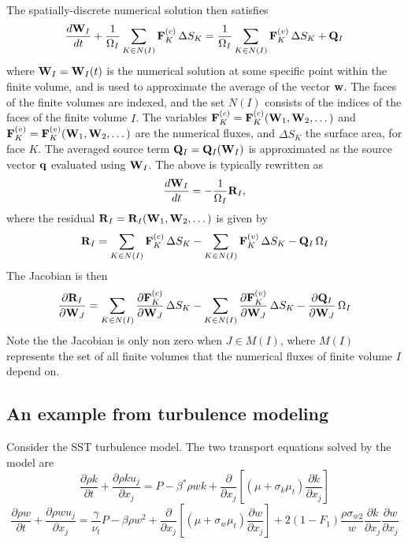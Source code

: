\documentclass[oneside,a4paper,11pt]{report}
\begin{document}
The spatially-discrete numerical solution then satisfies
\begin{equation}
\frac{d \mathbf{W}_I}{dt} +  \frac{1}{\Omega_I} \sum_{K \in N(I)} \mathbf{F}^{(c)}_K \,\Delta S_K = \frac{1}{\Omega_I} \sum_{K \in N(I)} \mathbf{F}^{(v)}_K \, \Delta S_K + \mathbf{Q}_I
\end{equation}
where $\mathbf{W}_I = \mathbf{W}_I(t)$ is the numerical solution at some specific point within the finite volume, and is used to approximate the average of the vector $\mathbf{w}$. The faces of the finite volumes are indexed, and the set $N(I)$ consists of the indices of the faces of the finite volume $I$. The variables $\mathbf{F}^{(c)}_K = \mathbf{F}^{(c)}_K(\mathbf{W}_1, \mathbf{W}_2, \dots)$ and $\mathbf{F}^{(v)}_K = \mathbf{F}^{(v)}_K(\mathbf{W}_1, \mathbf{W}_2,\dots)$ are the numerical fluxes, and $\Delta S_K$ the surface area, for face $K$. The averaged source term $\mathbf{Q}_I = \mathbf{Q}_I(\mathbf{W}_I)$ is approximated as the source vector $\mathbf{q}$ evaluated using $\mathbf{W}_I$. The above is typically rewritten as
\begin{equation}
\label{eq:finite_vol_ode}
\frac{d \mathbf{W}_I}{dt} = -\frac{1}{\Omega_I} \mathbf{R}_I,
\end{equation}
where the residual $\mathbf{R}_I = \mathbf{R}_I(\mathbf{W}_1, \mathbf{W}_2, \dots)$ is given by
\begin{equation}
\mathbf{R}_I = \sum_{K \in N(I)} \mathbf{F}^{(c)}_K \,\Delta S_K - \sum_{K \in N(I)} \mathbf{F}^{(v)}_K \, \Delta S_K - \mathbf{Q}_I\, \Omega_I
\end{equation}
The Jacobian is then
\begin{equation}
    \frac{\partial \mathbf{R}_I}{\partial \mathbf{W}_J} = \sum_{K \in N(I)} \frac{\partial \mathbf{F}^{(c)}_K}{\partial \mathbf{W}_J} \,\Delta S_K - \sum_{K \in N(I)} \frac{\partial \mathbf{F}^{(v)}_K}{\partial \mathbf{W}_J} \, \Delta S_K - \frac{\partial \mathbf{Q}_I}{\partial \mathbf{W}_J}\, \Omega_I
\end{equation}
Note the the Jacobian is only non zero when $J \in M(I)$, where $M(I)$ represents the set of all finite volumes that the numerical fluxes of finite volume $I$ depend on. 

\subsection{An example from turbulence modeling}
Consider the SST turbulence model. The two transport equations solved by the model are
\begin{equation}
    \frac{\partial \rho k}{\partial t} + \frac{\partial \rho k u_j}{\partial x_j} = P - \beta^* \rho w k + \frac{\partial}{\partial x_j} \left [ \left ( \mu + \sigma_k \mu_t \right ) \frac{\partial k}{\partial x_j} \right]
\end{equation}
\begin{equation}
    \frac{\partial \rho w}{\partial t} + \frac{\partial \rho w u_j}{\partial x_j} = \frac{\gamma}{\nu_t} P - \beta \rho w^2 + \frac{\partial}{\partial x_j} \left [ \left ( \mu + \sigma_w \mu_t \right) \frac{\partial w}{\partial x_j} \right] + 2 (1-F_1) \frac{\rho \sigma_{w2}}{w} \frac{\partial k}{\partial x_j}\frac{\partial w}{\partial x_j}
\end{equation}
\end{document}
